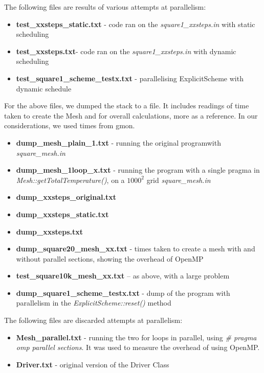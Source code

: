 \documentclass[11pt,journal]{IEEEtran}
\begin{document}
	The following files are results of various attempts at parallelism:
	\begin{itemize}
		\item \textbf{test\_xxsteps\_static.txt} - code ran on the \emph{square1\_xxsteps.in} with static scheduling
		\item \textbf{test\_xxsteps.txt}- code ran on the \emph{square1\_xxsteps.in} with dynamic scheduling
		\item \textbf{test\_square1\_scheme\_testx.txt} - parallelising ExplicitScheme with dynamic schedule
		
	\end{itemize}

	For the above files, we dumped the stack to a file. It includes readings of time taken to create the Mesh and for overall calculations, more as a reference. In our considerations, we used times from gmon.
	\begin{itemize}
		\item \textbf{dump\_mesh\_plain\_1.txt} - running the original programwith \emph{square\_mesh.in}
		\item \textbf{dump\_mesh\_1loop\_x.txt} - running the program with a single pragma in \emph{Mesh::getTotalTemperature()}, on a $1000^2$ grid \emph{square\_mesh.in}
		\item \textbf{dump\_xxsteps\_original.txt} 
		\item \textbf{dump\_xxsteps\_static.txt}
		\item \textbf{dump\_xxsteps.txt}
		\item \textbf{dump\_square20\_mesh\_xx.txt} - times taken to create a mesh with and without parallel sections, showing the overhead of OpenMP
		\item \textbf{test\_square10k\_mesh\_xx.txt} -- as above, with a large problem
		\item \textbf{dump\_square1\_scheme\_testx.txt} - dump of the program with parallelism in the \emph{ExplicitScheme::reset()} method
		
	\end{itemize}

	The following files are discarded attempts at parallelism:
	\begin{itemize}
		\item \textbf{Mesh\_parallel.txt} - running the two for loops in parallel, using \emph{\# pragma omp parallel sections}. It was used to measure the overhead of using OpenMP.
		\item \textbf{Driver.txt} - original version of the Driver Class
	\end{itemize}



	
\end{document}
